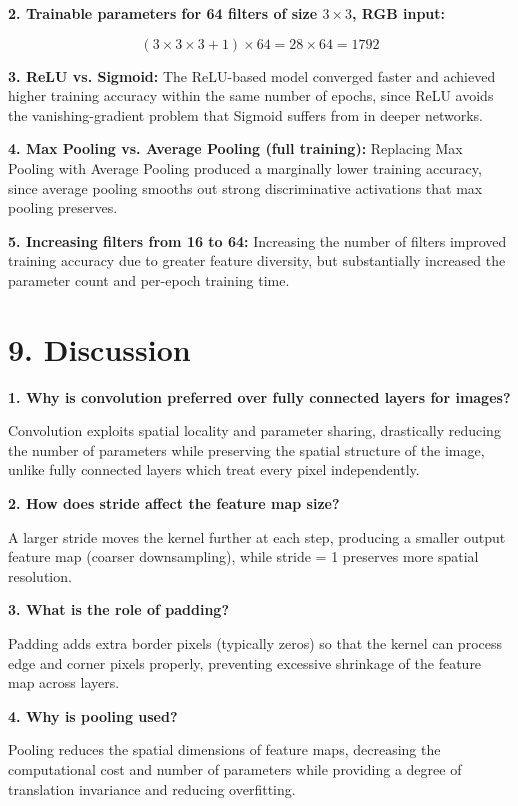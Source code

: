 \documentclass[11pt]{article}
\begin{document}
\textbf{2. Trainable parameters for 64 filters of size $3\times3$, RGB input:}

\[
(3 \times 3 \times 3 + 1) \times 64 = 28 \times 64 = 1792
\]

\textbf{3. ReLU vs. Sigmoid:} The ReLU-based model converged faster and achieved higher training accuracy within the same number of epochs, since ReLU avoids the vanishing-gradient problem that Sigmoid suffers from in deeper networks.

\textbf{4. Max Pooling vs. Average Pooling (full training):} Replacing Max Pooling with Average Pooling produced a marginally lower training accuracy, since average pooling smooths out strong discriminative activations that max pooling preserves.

\textbf{5. Increasing filters from 16 to 64:} Increasing the number of filters improved training accuracy due to greater feature diversity, but substantially increased the parameter count and per-epoch training time.


\section*{9. Discussion}

\textbf{1. Why is convolution preferred over fully connected layers for images?}

Convolution exploits spatial locality and parameter sharing, drastically reducing the number of parameters while preserving the spatial structure of the image, unlike fully connected layers which treat every pixel independently.

\textbf{2. How does stride affect the feature map size?}

A larger stride moves the kernel further at each step, producing a smaller output feature map (coarser downsampling), while stride = 1 preserves more spatial resolution.

\textbf{3. What is the role of padding?}

Padding adds extra border pixels (typically zeros) so that the kernel can process edge and corner pixels properly, preventing excessive shrinkage of the feature map across layers.

\textbf{4. Why is pooling used?}

Pooling reduces the spatial dimensions of feature maps, decreasing the computational cost and number of parameters while providing a degree of translation invariance and reducing overfitting.
\end{document}
